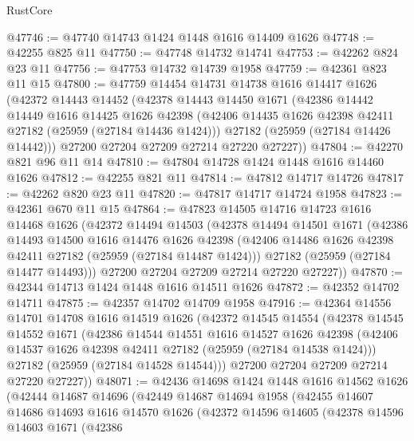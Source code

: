 \begin{lexlean}{RustCore}
\begin{coremodule}
@47746 := @47740 @14743 @1424 @1448 @1616 @14409 @1626
@47748 := @42255 @825 @11
@47750 := @47748 @14732 @14741
@47753 := @42262 @824 @23 @11
@47756 := @47753 @14732 @14739 @1958
@47759 := @42361 @823 @11 @15
@47800 := @47759
    @14454
    @14731
    @14738
    @1616
    @14417
    @1626
    (@42372
      @14443
      @14452
      (@42378
        @14443
        @14450
        @1671
        (@42386
          @14442
          @14449
          @1616
          @14425
          @1626
          @42398
          (@42406 @14435 @1626 @42398 @42411 @27182 (@25959 (@27184 @14436 @1424)))
          @27182
          (@25959 (@27184 @14426 @14442)))
        @27200
        @27204
        @27209
        @27214
        @27220
        @27227))
@47804 := @42270 @821 @96 @11 @14
@47810 := @47804 @14728 @1424 @1448 @1616 @14460 @1626
@47812 := @42255 @821 @11
@47814 := @47812 @14717 @14726
@47817 := @42262 @820 @23 @11
@47820 := @47817 @14717 @14724 @1958
@47823 := @42361 @670 @11 @15
@47864 := @47823
    @14505
    @14716
    @14723
    @1616
    @14468
    @1626
    (@42372
      @14494
      @14503
      (@42378
        @14494
        @14501
        @1671
        (@42386
          @14493
          @14500
          @1616
          @14476
          @1626
          @42398
          (@42406 @14486 @1626 @42398 @42411 @27182 (@25959 (@27184 @14487 @1424)))
          @27182
          (@25959 (@27184 @14477 @14493)))
        @27200
        @27204
        @27209
        @27214
        @27220
        @27227))
@47870 := @42344 @14713 @1424 @1448 @1616 @14511 @1626
@47872 := @42352 @14702 @14711
@47875 := @42357 @14702 @14709 @1958
@47916 := @42364
    @14556
    @14701
    @14708
    @1616
    @14519
    @1626
    (@42372
      @14545
      @14554
      (@42378
        @14545
        @14552
        @1671
        (@42386
          @14544
          @14551
          @1616
          @14527
          @1626
          @42398
          (@42406 @14537 @1626 @42398 @42411 @27182 (@25959 (@27184 @14538 @1424)))
          @27182
          (@25959 (@27184 @14528 @14544)))
        @27200
        @27204
        @27209
        @27214
        @27220
        @27227))
@48071 := @42436
    @14698
    @1424
    @1448
    @1616
    @14562
    @1626
    (@42444
      @14687
      @14696
      (@42449
        @14687
        @14694
        @1958
        (@42455
          @14607
          @14686
          @14693
          @1616
          @14570
          @1626
          (@42372
            @14596
            @14605
            (@42378
              @14596
              @14603
              @1671
              (@42386

\end{coremodule}
\end{lexlean}
